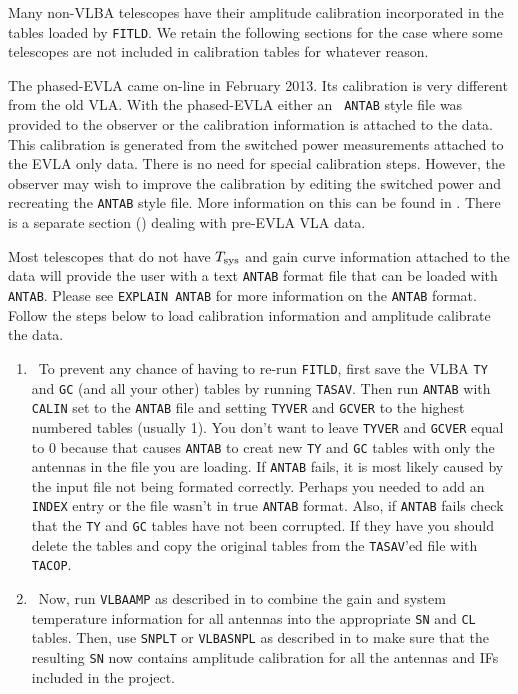 
Many non-VLBA telescopes have their amplitude calibration incorporated
in the tables loaded by {\tt FITLD}\@. We retain the following sections
for the case where some telescopes are not included in calibration
tables for whatever reason.

The phased-EVLA came on-line in February 2013.   Its calibration is
very different from the old VLA.  With the phased-EVLA either an {\tt
ANTAB} style file was provided to the observer or the calibration
information is attached to the data.  This calibration is generated from
the switched power measurements attached to the EVLA only data.
There is no need for special calibration steps.  However, the observer may
wish to improve the calibration by editing the switched power and recreating
the {\tt ANTAB} style file.  More information on this can be found in
.  There is a separate section () dealing with
pre-EVLA VLA data.


Most telescopes that do not have $T_{\rm sys}$ and gain
curve information attached to the data will provide the user with
a text {\tt ANTAB} format file that can be loaded with {\tt ANTAB}\@.
Please see {\tt EXPLAIN ANTAB} for more information on the {\tt ANTAB}
format.   Follow the steps below to load calibration
information and amplitude calibrate the data.
\begin{enumerate}

\item\ {To prevent any chance of having to re-run {\tt FITLD},
first save the VLBA {\tt TY} and {\tt GC} (and all your other)
tables by running {\tt TASAV}\@.  Then run {\tt ANTAB} with {\tt CALIN}
set to the {\tt ANTAB} file and setting {\tt TYVER} and {\tt GCVER}
to the highest numbered tables (usually 1).  You don't want to leave
{\tt TYVER} and {\tt GCVER} equal to 0 because that causes {\tt ANTAB}
to creat new {\tt TY} and {\tt GC} tables with only the antennas in the
file you are loading.  If {\tt ANTAB} fails, it is
most likely caused by the input file not being formated correctly.
Perhaps you needed to add an {\tt INDEX} entry or the file wasn't in true
{\tt ANTAB} format.  Also, if {\tt ANTAB} fails check that the {\tt TY}
and {\tt GC} tables have not been corrupted.  If they have you should
delete the tables and copy the original tables from the {\tt TASAV}'ed
file with {\tt TACOP}}\@.

\item\ {Now, run {\tt VLBAAMP} as described in  to
combine the gain and system temperature information for all antennas
into the appropriate {\tt SN} and {\tt CL} tables.  Then, use
{\tt SNPLT} or {\tt VLBASNPL} as described in  to make
sure that the resulting {\tt SN} now contains amplitude calibration
for all the antennas and IFs included in the project.}

\end{enumerate}

